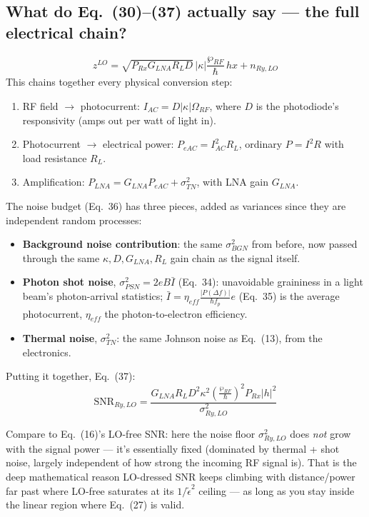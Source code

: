 \documentclass[11pt]{article}
\begin{document}
\subsection*{What do Eq.~(30)--(37) actually say --- the full electrical chain?}
\[
z^{LO}=\sqrt{P_{Rx}G_{LNA}R_LD}\,|\kappa|\frac{\wp_{RF}}{\hbar}\,hx+n_{Ry,LO}
\]
This chains together every physical conversion step:
\begin{enumerate}[nosep]
\item RF field $\to$ photocurrent: $I_{AC}=D|\kappa|\Omega_{RF}$, where $D$ is the photodiode's responsivity (amps out per watt of light in).
\item Photocurrent $\to$ electrical power: $P_{eAC}=I_{AC}^2R_L$, ordinary $P=I^2R$ with load resistance $R_L$.
\item Amplification: $P_{LNA}=G_{LNA}P_{eAC}+\sigma_{TN}^2$, with LNA gain $G_{LNA}$.
\end{enumerate}
The noise budget (Eq.~36) has three pieces, added as variances since they are independent random processes:
\begin{itemize}
\item \textbf{Background noise contribution}: the same $\sigma_{BGN}^2$ from before, now passed through the same $\kappa,D,G_{LNA},R_L$ gain chain as the signal itself.
\item \textbf{Photon shot noise}, $\sigma_{PSN}^2=2eB\bar I$ (Eq.~34): unavoidable graininess in a light beam's photon-arrival statistics; $\bar I=\eta_{eff}\frac{|P(\Delta f)|}{\hbar f_p}e$ (Eq.~35) is the average photocurrent, $\eta_{eff}$ the photon-to-electron efficiency.
\item \textbf{Thermal noise}, $\sigma_{TN}^2$: the same Johnson noise as Eq.~(13), from the electronics.
\end{itemize}
Putting it together, Eq.~(37):
\[
\text{SNR}_{Ry,LO}=\frac{G_{LNA}R_LD^2\kappa^2\left(\frac{\wp_{RF}}{\hbar}\right)^2P_{Rx}|h|^2}{\sigma_{Ry,LO}^2}
\]
\begin{eqmeaning}
Compare to Eq.~(16)'s LO-free SNR: here the noise floor $\sigma_{Ry,LO}^2$ does \emph{not} grow with the signal power --- it's essentially fixed (dominated by thermal + shot noise, largely independent of how strong the incoming RF signal is). That is the deep mathematical reason LO-dressed SNR keeps climbing with distance/power far past where LO-free saturates at its $1/\tilde\epsilon^2$ ceiling --- as long as you stay inside the linear region where Eq.~(27) is valid.
\end{eqmeaning}
\end{document}
